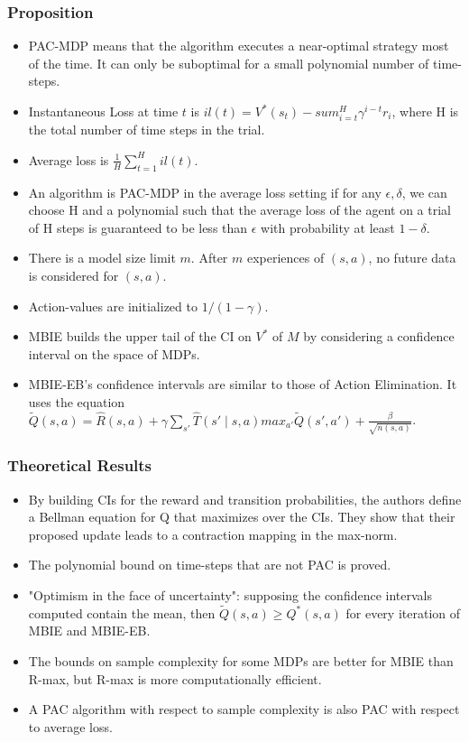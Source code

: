 \documentclass[12pt, oneside]{amsart}
\begin{document}
\subsubsection*{Proposition}
\begin{itemize}
	\item PAC-MDP means that the algorithm executes a near-optimal strategy most of the time. It can only be suboptimal for a small polynomial number of time-steps.
	\item Instantaneous Loss at time $t$ is $il(t) = V^*(s_t) - sum_{i=t}^H\gamma^{i-t}r_i$, where H is the total number of time steps in the trial.
	\item Average loss is $\frac{1}{H} \sum_{t=1}^{H} il(t)$.
	\item An algorithm is PAC-MDP in the average loss setting if for any $\epsilon, \delta$, we can choose H and a polynomial such that the average loss of the agent on a trial of H steps is guaranteed to be less than $\epsilon$ with probability at least $1-\delta$. 
	\item There is a model size limit $m$. After $m$ experiences of $(s, a)$, no future data is considered for $(s,a)$. 
	\item Action-values are initialized to $1/(1-\gamma)$.
	\item MBIE builds the upper tail of the CI on $V^*$ of $M$ by considering a confidence interval on the space of MDPs.
	\item MBIE-EB's confidence intervals are similar to those of Action Elimination. It uses the equation $\tilde{Q}(s,a) = \hat{R}(s,a) + \gamma \sum_{s'}\hat{T}(s'\mid s,a) max_{a'}\tilde{Q}(s',a') + \frac{\beta}{\sqrt{n(s,a)}}$.
\end{itemize}

\subsubsection*{Theoretical Results}
\begin{itemize}
	\item By building CIs for the reward and transition probabilities, the authors define a Bellman equation for Q that maximizes over the CIs. They show that their proposed update leads to a contraction mapping in the max-norm. 
	\item The polynomial bound on time-steps that are not PAC is proved.
	\item "Optimism in the face of uncertainty": supposing the confidence intervals computed contain the mean, then $\tilde{Q}(s,a)\geq Q^*(s,a)$ for every iteration of MBIE and MBIE-EB.
	\item The bounds on sample complexity for some MDPs are better for MBIE than R-max, but R-max is more computationally efficient.
	\item A PAC algorithm with respect to sample complexity is also PAC with respect to average loss.
\end{itemize}
\end{document}
